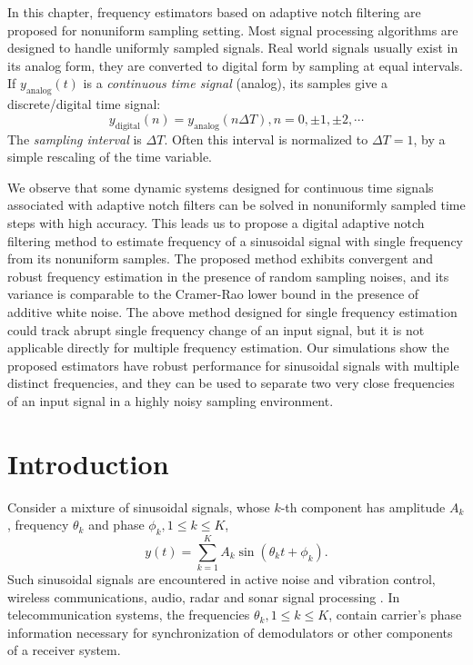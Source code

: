 \documentclass{UCF_ETD}
\begin{document}
In this chapter, frequency estimators based on adaptive notch filtering are proposed for nonuniform sampling setting. Most signal processing algorithms are designed to handle uniformly sampled signals. Real world signals usually exist in its analog form, they are converted to digital form by sampling at equal intervals. If $y_{\text{analog}}(t)$ is a \emph{continuous time signal} (analog), its samples give a discrete/digital time signal:
\begin{equation}
y_{\text{digital}}(n) = y_{\text{analog}}(n\Delta T), n = 0,\pm 1,\pm 2, \cdots
\end{equation}
The \emph{sampling interval} is $\Delta T$. Often this interval is normalized to $\Delta T = 1$, by a simple rescaling of the time variable.

We observe that some dynamic systems designed for continuous time signals associated with adaptive notch filters can be solved in nonuniformly
sampled time steps with high accuracy. This leads us to propose a digital adaptive notch filtering method to estimate frequency of a sinusoidal signal with single frequency from its nonuniform samples. The proposed method exhibits convergent and robust frequency estimation in the presence of random sampling noises, and its variance is comparable to the Cramer-Rao lower bound in the presence of additive white noise. The above method designed for single frequency estimation could track abrupt single frequency change of an input signal, but it is not applicable directly for multiple frequency estimation. Our simulations show the proposed estimators have robust performance for sinusoidal signals with multiple distinct frequencies, and they can be used to separate two very close frequencies of an input signal in a highly noisy sampling environment.


\section{Introduction}
Consider a mixture of sinusoidal signals, whose $k$-th component has amplitude $A_k$, frequency $\theta_k$ and  phase $\phi_k, 1\le k\le K$,
\begin{equation}\label{multiSinusoids1}
y(t)=\sum\limits_{k=1}^{K} A_k \sin(\theta_k t+\phi_k).
\end{equation}
Such  sinusoidal signals are encountered in  %
    active noise and vibration control, wireless communications, audio, radar and sonar signal processing \cite{regalia91, fuller96, Klapuri03, simone}. %
In telecommunication systems, the  frequencies $\theta_k, 1\le k\le K$,
 contain carrier's phase information necessary for synchronization of demodulators or other components of a receiver system.
\end{document}
